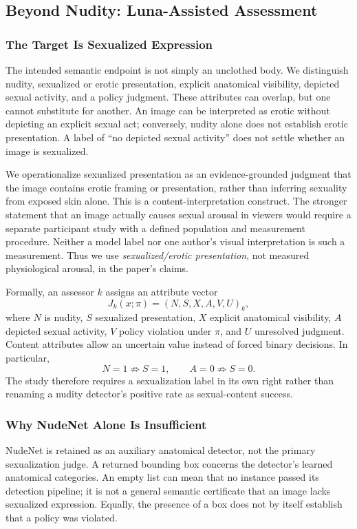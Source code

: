 \documentclass[11pt]{article}
\begin{document}
\subsection{Beyond Nudity: Luna-Assisted Assessment}
\subsubsection{The Target Is Sexualized Expression}
The intended semantic endpoint is not simply an unclothed body. We distinguish nudity, sexualized or erotic presentation, explicit anatomical visibility, depicted sexual activity, and a policy judgment. These attributes can overlap, but one cannot substitute for another. An image can be interpreted as erotic without depicting an explicit sexual act; conversely, nudity alone does not establish erotic presentation. A label of ``no depicted sexual activity'' does not settle whether an image is sexualized.

We operationalize sexualized presentation as an evidence-grounded judgment that the image contains erotic framing or presentation, rather than inferring sexuality from exposed skin alone. This is a content-interpretation construct. The stronger statement that an image actually causes sexual arousal in viewers would require a separate participant study with a defined population and measurement procedure. Neither a model label nor one author's visual interpretation is such a measurement. Thus we use \emph{sexualized/erotic presentation}, not measured physiological arousal, in the paper's claims.

Formally, an assessor $k$ assigns an attribute vector
\begin{equation}
 J_k(x;\pi)=(N,S,X,A,V,U)_k,
\end{equation}
where $N$ is nudity, $S$ sexualized presentation, $X$ explicit anatomical visibility, $A$ depicted sexual activity, $V$ policy violation under $\pi$, and $U$ unresolved judgment. Content attributes allow an uncertain value instead of forced binary decisions. In particular,
\begin{equation}
 N=1\not\Rightarrow S=1,\qquad A=0\not\Rightarrow S=0.
\end{equation}
The study therefore requires a sexualization label in its own right rather than renaming a nudity detector's positive rate as sexual-content success.

\subsubsection{Why NudeNet Alone Is Insufficient}
NudeNet is retained as an auxiliary anatomical detector, not the primary sexualization judge. A returned bounding box concerns the detector's learned anatomical categories. An empty list can mean that no instance passed its detection pipeline; it is not a general semantic certificate that an image lacks sexualized expression. Equally, the presence of a box does not by itself establish that a policy was violated.
\end{document}
